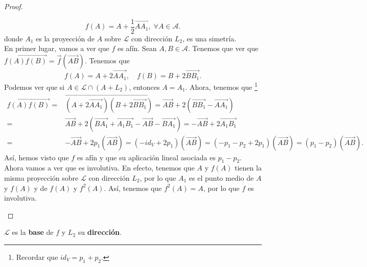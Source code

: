 \begin{proof}
\begin{description}
	\[ f\left(A\right)=A+\frac{1}{2}\overrightarrow{AA_{1}}, \; \forall A \in \mathcal{A} .\]
	donde $\displaystyle A_{1} $ es la proyección de $\displaystyle A $ sobre $\displaystyle \mathcal{L} $ con dirección $\displaystyle L_{2} $, es una simetría. \\
	En primer lugar, vamos a ver que $\displaystyle f $ es afín. Sean $\displaystyle A,B \in \mathcal{A} $. Tenemos que ver que $\displaystyle \overrightarrow{f\left(A\right)f\left(B\right)} = \vec{f}\left(\overrightarrow{AB} \right) $. Tenemos que 
\[f\left(A\right) = A + 2\overrightarrow{AA_{1}}, \quad f\left(B\right) = B + 2\overrightarrow{BB_{1}}  .\]
Podemos ver que si $\displaystyle A \in \mathcal{L} \cap \left(A + L_{2}\right) $, entonces $\displaystyle A = A_{1} $. Ahora, tenemos que \footnote{Recordar que $\displaystyle id _{V} = p_{1} + p_{2} $.} 
\[
\begin{split}
	\overrightarrow{f\left(A\right)f\left(B\right)} = & \overrightarrow{\left(A + 2\overrightarrow{AA_{1}} \right)\left(B + 2\overrightarrow{BB_{1}} \right)} =\overrightarrow{AB} +2\left(\overrightarrow{BB_{1}} -\overrightarrow{AA_{1}} \right) \\
	= &  \overrightarrow{AB} +2\left(\overrightarrow{BA_{1}} +\overrightarrow{A_{1}B_{1}} -\overrightarrow{AB} -\overrightarrow{BA_{1}} \right) 
	= -\overrightarrow{AB} +2\overrightarrow{A_{1}B_{1}} \\
	= &  -\overrightarrow{AB} +2p_{1}\left(\overrightarrow{AB} \right) = \left(-id _{V} + 2 p_{1}\right)\left(\overrightarrow{AB} \right) =\left(-p_{1}-p_{2}  + 2p_{1}\right)\left(\overrightarrow{AB} \right) = \left(p_{1}-p_{2}\right)\left(\overrightarrow{AB} \right) .
\end{split}
\]
Así, hemos visto que $\displaystyle f $ es afín y que su aplicación lineal asociada es $\displaystyle p_{1} - p_{2} $. Ahora vamos a ver que es involutiva. En efecto, tenemos que $\displaystyle A $ y $\displaystyle f\left(A\right) $ tienen la misma proyección sobre $\displaystyle \mathcal{L} $ con dirección $\displaystyle L_{2} $, por lo que $\displaystyle A_{1} $ es el punto medio de $\displaystyle A $ y $\displaystyle f\left(A\right) $ y de $\displaystyle f\left(A\right) $ y $\displaystyle f^{2}\left(A\right) $. Así, tenemos que $\displaystyle f^{2}\left(A\right) = A $, por lo que $\displaystyle f $ es involutiva. 
\end{description}
\end{proof}
\begin{fdefinition}[]
\normalfont $\displaystyle \mathcal{L} $ es la \textbf{base} de $\displaystyle f $ y $\displaystyle L_{2} $ su \textbf{dirección}.
\end{fdefinition}
